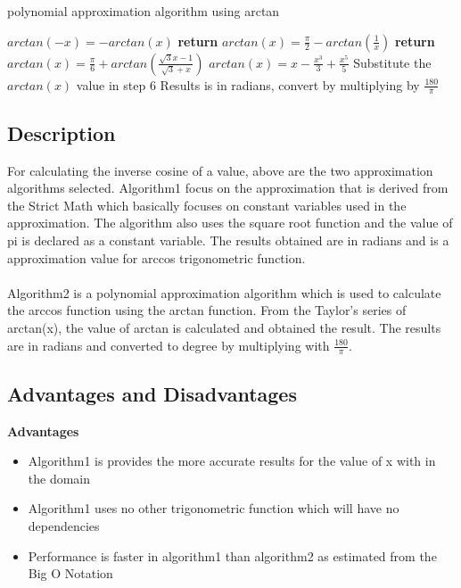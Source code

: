 \documentclass[12pt]{report}
\begin{document}
\pagebreak
\begin{algorithm}
\caption{polynomial approximation algorithm using arctan}
\begin{algorithmic}[1]
  \State $arctan(-x) = -arctan(x)$
\EndIf
{}
  \State \textbf{return} $arctan(x) = \frac{\pi}{2}-arctan(\frac{1}{x})$ 
\EndIf
{}
  \State \textbf{return} $arctan(x) =\frac{\pi}{6}+arctan(\frac{\sqrt{3}x-1}{\sqrt{3}+x})$ 
\EndIf
\State $arctan(x) = x - \frac{x^3}{3} + \frac{x^5}{5}$
\State Substitute the $arctan(x)$ value in step 6
\State Results is in radians, convert by multiplying by $\frac{180}{\pi} $
\end{algorithmic}
\end{algorithm}

\subsection{Description}
For calculating the inverse cosine of a value, above are the two approximation algorithms selected. Algorithm1 focus on the approximation that is derived from the Strict Math which basically focuses on constant variables used in the approximation. The algorithm also uses the square root function and the value of pi is declared as a constant variable. The results obtained are in radians and is a approximation value for arccos trigonometric function.
\paragraph{}
Algorithm2 is a polynomial approximation algorithm which is used to calculate the arccos function using the arctan function. From the Taylor's series of arctan(x), the value of arctan is calculated and obtained the result. The results are in radians and converted to degree by multiplying with $\frac{180}{\pi}$.

\subsection{Advantages and Disadvantages}
\textbf{Advantages}
\begin{itemize}
    \item Algorithm1 is provides the more accurate results for the value of x with in the domain
    \item Algorithm1 uses no other trigonometric function which will have no dependencies
    \item Performance is faster in algorithm1 than algorithm2 as estimated from the Big O Notation
\end{itemize}
\end{document}
